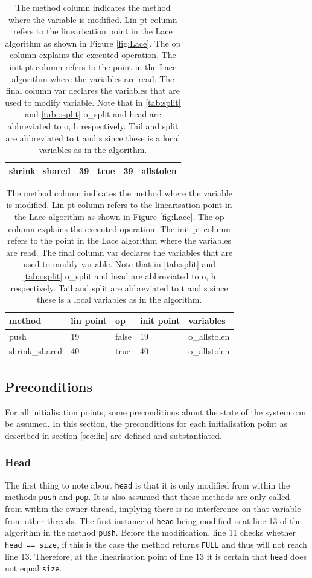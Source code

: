 \documentclass{sig-alternate-br}
\begin{document}
\begin{table}[h]
\begin{subtable}[h]{0.45\textwidth}
\begin{tabular}{|l|l|l|l|l|}
			shrink\_shared  & 39                 & true        & 39                  & allstolen          \\ \hline
		\end{tabular}
		\caption{Linearisation points of allstolen variable}
		\label{tab:allst}
	\end{subtable}
	\begin{subtable}[h]{0.45\textwidth}
		\centering
		\begin{tabular}{|l|l|l|l|l|}
			\hline
			\textbf{method} & \textbf{lin point} & \textbf{op} & \textbf{init point} & \textbf{variables} \\ \hline
			push            & 19                 & false       & 19                  & o\_allstolen       \\ \hline
			shrink\_shared  & 40                 & true        & 40                  & o\_allstolen       \\ \hline
		\end{tabular}
		\caption{Linearisation points of o\_allstolen variable}
		\label{tab:oallst}
	\end{subtable}
	\caption{ The method column indicates the method where the variable is modified. Lin pt column refers to the linearisation point in the Lace algorithm as shown in Figure \ref{fig:Lace}. The op column explains the executed operation. The init pt column refers to the point in the Lace algorithm where the variables are read. The final column var declares the variables that are used to modify variable. Note that in \ref{tab:split} and \ref{tab:osplit} o\_split and head are abbreviated to o, h respectively. Tail and split are abbreviated to t and s since these is a local variables as in the algorithm.}
\end{table}

\subsection{Preconditions}
For all initialisation points, some preconditions about the state of the system can be assumed.
In this section, the preconditions for each initialisation point as described in section \ref{sec:lin} are defined and substantiated.

\subsubsection{Head}
The first thing to note about \texttt{head} is that it is only modified from within the methods \texttt{push} and \texttt{pop}.
It is also assumed that these methods are only called from within the owner thread, implying there is no interference on that variable from other threads.
The first instance of \texttt{head} being modified is at line 13 of the algorithm in the method \texttt{push}.
Before the modification, line 11 checks whether \texttt{head == size}, if this is the case the method returns \texttt{FULL} and thus will not reach line 13.
Therefore, at the linearisation point of line 13 it is certain that \texttt{head} does not equal \texttt{size}.
\end{document}

